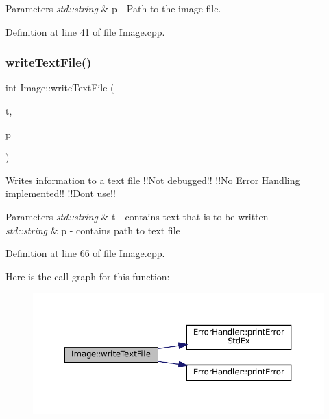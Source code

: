 \begin{DoxyParams}{Parameters}
{\em std\+::string} & p -\/ Path to the image file. \\
\hline
\end{DoxyParams}


Definition at line 41 of file Image.\+cpp.

\mbox{\label{classImage_a2dc30c9d6280b8c0edd2f4f0ab474a5c}} 
\subsubsection{\texorpdfstring{writeTextFile()}{writeTextFile()}}
{\footnotesize\ttfamily int Image\+::write\+Text\+File (\begin{DoxyParamCaption}\item[{std\+::string}]{t,  }\item[{std\+::string}]{p }\end{DoxyParamCaption})}



Writes information to a text file !!\+Not debugged!! !!\+No Error Handling implemented!! !!\+Dont use!! 


\begin{DoxyParams}{Parameters}
{\em std\+::string} & t -\/ contains text that is to be written \\
\hline
{\em std\+::string} & p -\/ contains path to text file \\
\hline
\end{DoxyParams}


Definition at line 66 of file Image.\+cpp.

Here is the call graph for this function\+:
\nopagebreak
\begin{figure}[H]
\begin{center}
\leavevmode
\includegraphics[width=350pt]{classImage_a2dc30c9d6280b8c0edd2f4f0ab474a5c_cgraph}
\end{center}
\end{figure}


